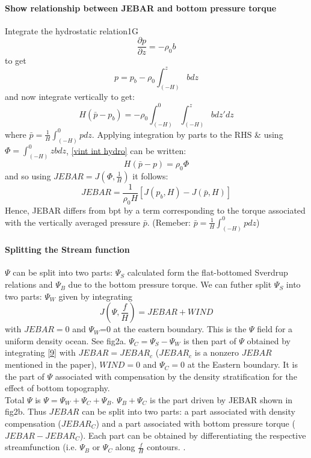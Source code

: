 \documentclass[..\Papers.tex]{subfiles}
\begin{document}
\paragraph{Show relationship between JEBAR and bottom pressure torque}
Integrate the hydrostatic relation1G
    \begin{equation} \label{hydrostatic relation}
        \frac{\partial p}{\partial z} = - \rho_0 b
    \end {equation}
to get
    \begin{equation} \label{int hydro}
        p = p_b - \rho_0 \int_(-H)^z b dz
    \end{equation}
and now integrate vertically to get:
    \begin{equation} \label{vint int hydro}
        H(\bar{p} - p_b) = -\rho_0 \int_(-H)^0\int_(-H)^z b dz' dz
    \end{equation}
where $\bar{p} = \frac{1}{H}\int_(-H)^0 p dz$. Applying integration by parts to the RHS \& using $\Phi = \int_(-H)^0 zb dz$, \ref{vint int hydro} can be written:
    \begin{equation}
        H(\bar{p}-p)=\rho_0\Phi
    \end{equation}
        and so using $JEBAR = J(\Phi,\frac{1}{H})$  it follows:
    \begin{equation} \label{JEBAR}
        JEBAR=\frac{1}{\rho_0 H}[J(p_b,H)-J(\bar{p},H)]
    \end{equation}
Hence, JEBAR differs from bpt by a term corresponding to the torque associated with the vertically averaged pressure $\bar{p}$. (Remeber: $\bar{p} = \frac{1}{H}\int_(-H)^0 p dz$)


\paragraph{Splitting the Stream function}
$\Psi$ can be split into two parts: $\Psi_S$ calculated form the flat-bottomed Sverdrup relations and $\Psi_B$ due to the bottom pressure torque. We can futher split $\Psi_S$ into two parts: $\Psi_W$ given by integrating
    \begin{equation} \label{9}
        J(\Psi,\frac{f}{H})=JEBAR+WIND
    \end{equation}
with $JEBAR=0$ and $\Psi_W$=0 at the eastern boundary. This is the $\Psi$ field for a uniform density ocean. See fig2a.
$\Psi_C=\Psi_S-\Psi_W$ is then part of $\Psi$ obtained by integrating \ref{9} with $JEBAR=JEBAR_c$ ($JEBAR_c$ is a nonzero $JEBAR$ mentioned in the paper), $WIND=0$ and $\Psi_C=0$ at the Eastern boundary. It is the part of $\Psi$ associated with compensation by the density stratification for the effect of bottom topography.
        \\Total $\Psi$ is $\Psi = \Psi_W+\Psi_C+\Psi_B$. $\Psi_B+\Psi_C$ is the part driven by JEBAR shown in fig2b. Thus $JEBAR$ can be split into two parts: a part associated with density compensation ($JEBAR_C$) and a part associated with bottom pressure torque ($JEBAR-JEBAR_C$). Each part can be obtained by differentiating the respective streamfunction (i.e. $\Psi_B$ or $\Psi_C$ along $\frac{f}{H}$ contours. .
\end{document}

